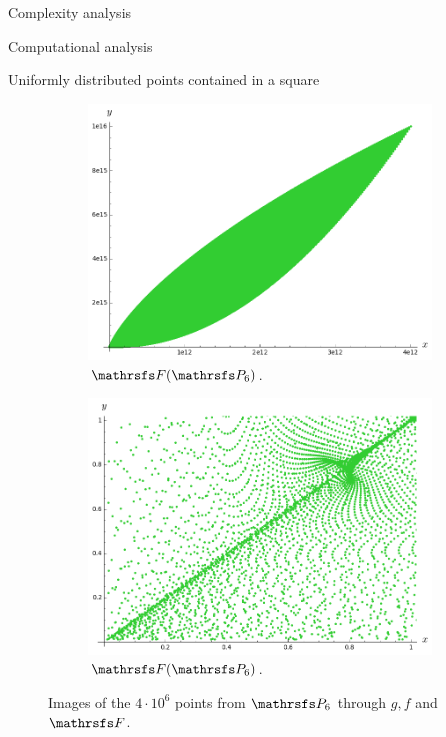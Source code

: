 \documentclass[11pt, a4paper, english, twoside, notitlepage, openright]{report}
\begin{document}
\begin{chapter}{Complexity analysis}
\begin{section}{Computational analysis}
\begin{subsection}{Uniformly distributed points contained in a square}
\begin{figure}
\hspace{-0.1cm}
\begin{subfigure}{.49\linewidth}\centering
\includegraphics[width=1\textwidth]{plots/ch5_21_P6.png}
\vspace{0cm}\caption{$\FFF(\PP_6)$.\label{fig:FFFP6_1}}
\end{subfigure}
\begin{subfigure}{.49\linewidth}\centering
\includegraphics[width=1\textwidth]{plots/ch5_22_P6prime.png}
\vspace{0cm}\caption{$\FFF(\PP_6)$.\label{fig:FFFP6_2}}
\end{subfigure}
\vspace{0.1cm}\caption{Images of the $4\cdot 10^6$ points from $\PP_6$ through $g, f$ and $\FFF$.\label{fig:P6}}
\end{figure}


\end{subsection}
\end{section}
\end{chapter}
\end{document}

